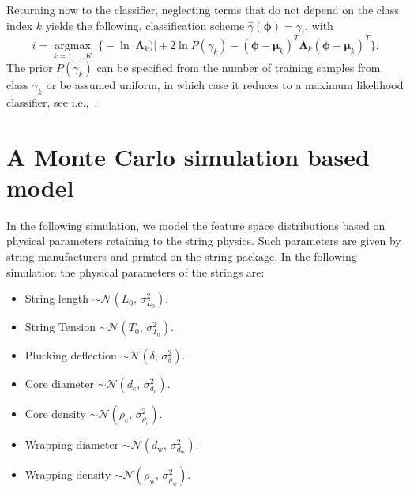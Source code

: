 \documentclass{article}
\begin{document}
\begin{sloppy}
%
Returning now to the classifier, neglecting terms that do not depend on the class index $k$ yields the following, classification scheme $\hat{\gamma}(\boldsymbol{\phi})={\gamma}_i$, with
%
\begin{equation}\label{eq:classifier}
  i=\underset{k=1,\dots,K}{\operatorname{argmax}}\;
\bigg\{ -\ln \lvert \boldsymbol{\Lambda}_k) \rvert + 2 \ln P(\gamma_k) - (\boldsymbol{\phi}-\boldsymbol{\mu}_k)^T \boldsymbol{\Lambda}_k (\boldsymbol{\phi}-\boldsymbol{\mu}_k)^T    %
\bigg\}.
\end{equation}
%
The prior $P(\gamma_k)$ can be specified from the number of training samples from class $\gamma_k$ or be assumed uniform, in which case it reduces to a maximum likelihood classifier, see i.e.,~\cite{mspr}.
%
\section{A Monte Carlo simulation based model}
In the following simulation, we model the feature space distributions based on physical parameters retaining to the string physics. Such parameters are given by string manufacturers and printed on the string package. In the following simulation the physical parameters of the strings are:
\begin{itemize}
    \item String length $\sim \mathcal{N}(L_0,\,\sigma_{L_0}^{2})$.
    \item String Tension $\sim \mathcal{N}(T_0,\,\sigma_{T_0}^{2})$.
    \item Plucking deflection $\sim \mathcal{N}(\delta,\,\sigma_{\delta}^{2})$.

    \item Core diameter $\sim \mathcal{N}(d_\text{c},\,\sigma_{d_\text{c}}^{2})$.
    \item Core density $\sim \mathcal{N}(\rho_\text{c},\,\sigma_{\rho_\text{c}}^{2})$.
    \item Wrapping diameter $\sim \mathcal{N}(d_\text{w},\,\sigma_{d_\text{w}}^{2})$.
    \item Wrapping density $\sim \mathcal{N}(\rho_\text{w},\,\sigma_{\rho_\text{w}}^{2})$.

\end{itemize}
%
%
%
%

\end{sloppy}
\end{document}

